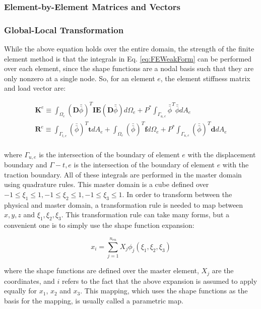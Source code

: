 \documentclass[10pt]{article}
\begin{document}
\subsubsection{Element-by-Element Matrices and Vectors}
\subsubsection{Global-Local Transformation}

While the above equation holds over the entire domain, the strength of the finite element method is that the integrals in Eq. \eqref{eq:FEWeakForm} can be performed over each element, since the shape functions are a nodal basis such that they are only nonzero at a single node. So, for an element \(e\), the element stiffness matrix and load vector are:

\begin{equation}
\label{eq:FEWeakForm_element}
\begin{aligned}
\textbf{K}^e\equiv\int_{\Omega_e}(\textbf{D}\bar{\bar{\phi}})^T\textbf{IE}(\textbf{D}\bar{\bar{\phi}})d\Omega_e +P^{*}\int_{\Gamma_{u,e}}\bar{\bar{\phi}}^T\bar{\bar{\phi}}dA_e\\
\textbf{R}^e\equiv\int_{\Gamma_{t,e}}(\bar{\bar{\phi}})^T\textbf{t}dA_e+\int_{\Omega_e}(\bar{\bar{\phi}})^T\textbf{f}d\Omega_e+P^{*}\int_{\Gamma_{u,e}}(\bar{\bar{\phi}})^T\textbf{d}dA_e\\
\end{aligned}
\end{equation}

where \(\Gamma_{u,e}\) is the intersection of the boundary of element \(e\) with the displacement boundary and \(\Gamma-{t,e}\) is the intersection of the boundary of element \(e\) with the traction boundary. All of these integrals are performed in the master domain using quadrature rules. This master domain is a cube defined over \(-1\leq\xi_1\leq1, -1\leq\xi_2\leq1, -1\leq\xi_3\leq1\). In order to transform between the physical and master domain, a transformation rule is needed to map between \(x,y,z\) and \(\xi_1,\xi_2,\xi_3\). This transformation rule can take many forms, but a convenient one is to simply use the shape function expansion:

\begin{equation}
x_i=\sum_{j=1}^{n_{en}}X_j\phi_j(\xi_1,\xi_2,\xi_3)
\end{equation}

where the shape functions are defined over the master element, \(X_j\) are the coordinates, and \(i\) refers to the fact that the above expansion is assumed to apply equally for \(x_1\), \(x_2\) and \(x_3\). This mapping, which uses the shape functions as the basis for the mapping, is usually called a parametric map. 
\end{document}
